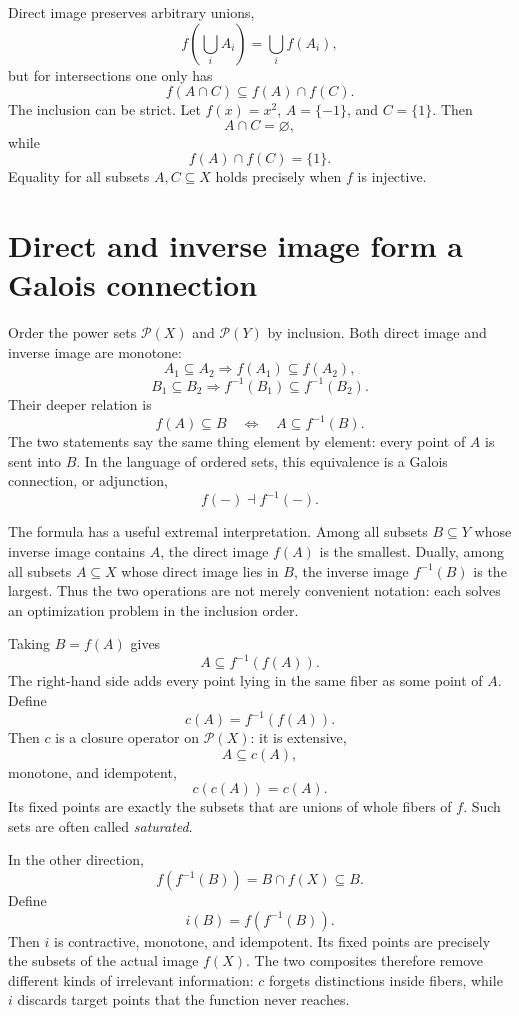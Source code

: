 Direct image preserves arbitrary unions,
\[
  f\left(\bigcup_i A_i\right)=\bigcup_i f(A_i),
\]
but for intersections one only has
\[
  f(A\cap C)\subseteq f(A)\cap f(C).
\]
The inclusion can be strict.  Let \(f(x)=x^2\), \(A=\{-1\}\), and \(C=\{1\}\).  Then
\[
  A\cap C=\varnothing,
\]
while
\[
  f(A)\cap f(C)=\{1\}.
\]
Equality for all subsets \(A,C\subseteq X\) holds precisely when \(f\) is injective.

\section{Direct and inverse image form a Galois connection}

Order the power sets \(\mathcal P(X)\) and \(\mathcal P(Y)\) by inclusion.  Both direct image and inverse image are monotone:
\[
  A_1\subseteq A_2
  \Longrightarrow
  f(A_1)\subseteq f(A_2),
\]
\[
  B_1\subseteq B_2
  \Longrightarrow
  f^{-1}(B_1)\subseteq f^{-1}(B_2).
\]
Their deeper relation is
\[
  \boxed{
  f(A)\subseteq B
  \quad\Longleftrightarrow\quad
  A\subseteq f^{-1}(B).}
\]
The two statements say the same thing element by element: every point of \(A\) is sent into \(B\).  In the language of ordered sets, this equivalence is a Galois connection, or adjunction,
\[
  f(-)\dashv f^{-1}(-).
\]

The formula has a useful extremal interpretation.  Among all subsets \(B\subseteq Y\) whose inverse image contains \(A\), the direct image \(f(A)\) is the smallest.  Dually, among all subsets \(A\subseteq X\) whose direct image lies in \(B\), the inverse image \(f^{-1}(B)\) is the largest.  Thus the two operations are not merely convenient notation: each solves an optimization problem in the inclusion order.

Taking \(B=f(A)\) gives
\[
  A\subseteq f^{-1}(f(A)).
\]
The right-hand side adds every point lying in the same fiber as some point of \(A\).  Define
\[
  c(A)=f^{-1}(f(A)).
\]
Then \(c\) is a closure operator on \(\mathcal P(X)\): it is extensive,
\[
  A\subseteq c(A),
\]
monotone, and idempotent,
\[
  c(c(A))=c(A).
\]
Its fixed points are exactly the subsets that are unions of whole fibers of \(f\).  Such sets are often called \emph{saturated}.

In the other direction,
\[
  f(f^{-1}(B))=B\cap f(X)\subseteq B.
\]
Define
\[
  i(B)=f(f^{-1}(B)).
\]
Then \(i\) is contractive, monotone, and idempotent.  Its fixed points are precisely the subsets of the actual image \(f(X)\).  The two composites therefore remove different kinds of irrelevant information: \(c\) forgets distinctions inside fibers, while \(i\) discards target points that the function never reaches.

